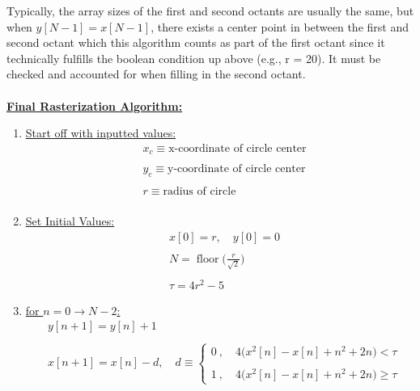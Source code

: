\documentclass{article}
\DeclareMathOperator{\floor}{floor}
\begin{document}
Typically, the array sizes of the first and second octants are usually the same, but when $y[N - 1] = x[N - 1]$,
there exists a center point in between the first and second octant which this algorithm counts as part of the first
octant since it technically fulfills the boolean condition up above (e.g., r = 20). It must be checked and accounted for when filling
in the second octant. \\ \\

\underline{\textbf{Final Rasterization Algorithm:}} \\
\begin{enumerate}
    \item \underline{Start off with inputted values:} \\
          \begin{align*}
                &x_c \equiv \text{x-coordinate of circle center} \\ \\
                &y_c \equiv \text{y-coordinate of circle center} \\ \\
                &r \equiv \text{radius of circle} \\
            \end{align*}
    \item \underline{Set Initial Values:} 
          \begin{align*}
                &x[0] = r, \quad y[0] = 0 \\ \\
                &N = \floor\Bigg(\frac{r}{\sqrt{2}}\Bigg) \\ \\
                &\tau = 4r^{2} - 5
            \end{align*}
    \item \underline{for $n = 0 \rightarrow N - 2$:} \\
          \begin{align*}
            &y[n + 1] = y[n] + 1 \\ \\
            &x[n + 1] = x[n] - d, \quad d \equiv \begin{cases}
                                                     0 \ , \quad 4\Big(x^{2}[n] - x[n] + n^{2} + 2n\Big) < \tau \\ \\
                                                     1 \ , \quad 4\Big(x^{2}[n] - x[n] + n^{2} + 2n\Big) \geq \tau
                                                   \end{cases}

\end{align*}
\end{enumerate}
\end{document}
